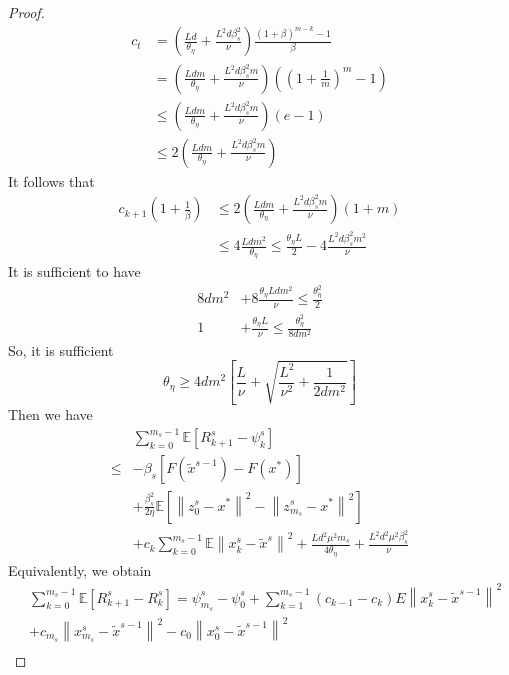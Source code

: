 \documentclass{article}
\newcommand*{\E}{\mathbb{E}}
\newcommand{\norm}[1]{\left\lVert#1\right\rVert}
\theoremstyle{definition}
\theoremstyle{remark}
\begin{document}
\begin{proof}
\begin{equation}
\begin{split}
c_t &= (\frac{Ld}{\theta_{\eta}}+\frac{L^2d\beta_s^2}{\nu}) \frac{(1+\beta)^{m-k}-1}{\beta} \\
&= (\frac{Ldm}{\theta_{\eta}}+\frac{L^2d\beta_s^2m}{\nu})((1+\frac{1}{m})^m-1)\\
&\leq (\frac{Ldm}{\theta_{\eta}}+\frac{L^2d\beta_s^2m}{\nu})(e-1)\\
&\leq 2(\frac{Ldm}{\theta_{\eta}}+\frac{L^2d\beta_s^2m}{\nu})
\end{split}
\end{equation}
It follows that 
\begin{equation}
\begin{split}
c_{k+1}(1+\frac{1}{\beta})&\leq 2(\frac{Ldm}{\theta_{\eta}}+\frac{L^2d\beta_s^2m}{\nu})(1+m)\\
&\leq 4\frac{Ldm^2}{\theta_{\eta}} \leq \frac{\theta_\eta L}{2}-4\frac{L^2d\beta_s^2m^2}{\nu}
\end{split}
\end{equation}
It is sufficient to have
\begin{equation}
\begin{split}
 8{dm^2}&+8\frac{\theta_\eta Ldm^2}{\nu} \leq \frac{\theta_\eta^2}{2}\\
  1&+\frac{\theta_\eta L}{\nu} \leq \frac{\theta_\eta^2}{8{dm^2}}
\end{split}
\end{equation}
So, it is sufficient
\[
\theta_\eta \geq 4 dm^2 \left[ \frac{L}{\nu}+\sqrt{\frac{L^2}{\nu^2}+\frac{1}{2dm^2}}\right]
\]
Then we have 
\begin{equation}
\begin{split}
&\sum_{k=0}^{m_s-1} \E[R_{k+1}^s - \psi_{k}^s]\\
\leq &-\beta_s[F(\widetilde{x}^{s-1})-F(x^*)] \\
&+ {\frac{ \beta_s^2}{2\eta}}\E[\norm{z_{0}^s-x^*}^2-\norm{z_{m_s}^s-x^*}^2]\\
&+ c_k\sum_{k=0}^{m_s-1} \E\norm{x_k^s-\widetilde{x}^s}^2+\frac{Ld^2\mu^2m_s}{4\theta_{\eta}}+\frac{L^2d^2\mu^2\beta_s^2}{\nu}
\end{split}
\end{equation}
Equivalently, we obtain
\begin{equation}
\begin{split}
&\sum_{k=0}^{m_s-1} \E[R_{k+1}^s - R_{k}^s]= \psi_{m_s}^s- \psi_{0}^s + \sum_{k=1}^{m_s-1}(c_{k-1}-c_k)E\norm{x_k^s-\widetilde{x}^{s-1}}^2\\
&+c_{m_s}\norm{x_{m_s}^s-\widetilde{x}^{s-1}}^2-c_{0}\norm{x_{0}^s-\widetilde{x}^{s-1}}^2\\

\end{split}
\end{equation}
\end{proof}
\end{document}
